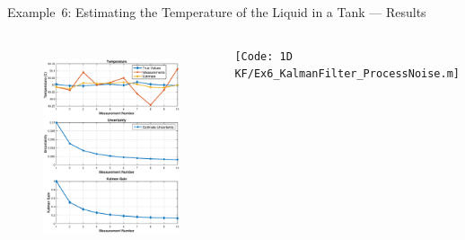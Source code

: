 \begin{frame}{Example~6: Estimating the Temperature of the Liquid in a Tank --- Results}
\begin{columns}
\begin{figure}
        \includegraphics[width=1\textwidth]{Figures/Chapter1/ex6_KalmanFilter_ProcessNoise.eps}
        \label{fig:ex6_KalmanFilter_ProcessNoise}
        \vspace{-25pt}
    \end{figure}
    \texttt{\tiny [Code: 1D KF/Ex6\_KalmanFilter\_ProcessNoise.m]}
\end{columns}
\end{frame}
